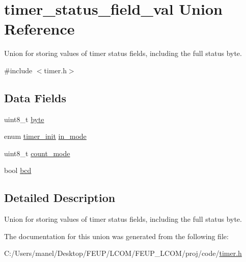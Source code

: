 \hypertarget{uniontimer__status__field__val}{}\section{timer\+\_\+status\+\_\+field\+\_\+val Union Reference}
\label{uniontimer__status__field__val}


Union for storing values of timer status fields, including the full status byte.  




{\ttfamily \#include $<$timer.\+h$>$}

\subsection*{Data Fields}
\begin{DoxyCompactItemize}
\item 
uint8\+\_\+t \mbox{\hyperlink{group__timer_ga37d15361e9d111d7f18f943d85964f51}{byte}}
\item 
enum \mbox{\hyperlink{group__timer_ga5cc20f14fd50625eea9b20f58fbe2a55}{timer\+\_\+init}} \mbox{\hyperlink{group__timer_ga16c0028c537ce578196381bdc0cd97fd}{in\+\_\+mode}}
\item 
uint8\+\_\+t \mbox{\hyperlink{group__timer_ga069cd58184fd977a3345d560f159037a}{count\+\_\+mode}}
\item 
bool \mbox{\hyperlink{group__timer_gad1c0daae1fe44fc16a05f435123a99f2}{bcd}}
\end{DoxyCompactItemize}


\subsection{Detailed Description}
Union for storing values of timer status fields, including the full status byte. 

The documentation for this union was generated from the following file\+:\begin{DoxyCompactItemize}
\item 
C\+:/\+Users/manel/\+Desktop/\+F\+E\+U\+P/\+L\+C\+O\+M/\+F\+E\+U\+P\+\_\+\+L\+C\+O\+M/proj/code/\mbox{\hyperlink{timer_8h}{timer.\+h}}\end{DoxyCompactItemize}
